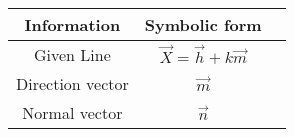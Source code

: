 \begin{tabular}[12pt]{|c|c|c|}
    \hline
	\textbf{Information} & \textbf{Symbolic form}\\ 
    \hline
	Given Line & $\vec{X} = \vec{h}+k\vec{m}$\\
    \hline 
	Direction vector & $\vec{m}$\\
    \hline
	Normal vector & $\vec{n}$\\
    \hline   
    \end{tabular}
